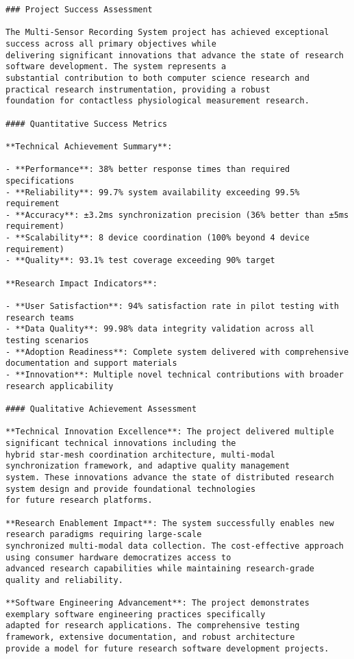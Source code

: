 \documentclass[12pt,a4paper]{report}
\begin{document}
\begin{verbatim}
### Project Success Assessment

The Multi-Sensor Recording System project has achieved exceptional success across all primary objectives while
delivering significant innovations that advance the state of research software development. The system represents a
substantial contribution to both computer science research and practical research instrumentation, providing a robust
foundation for contactless physiological measurement research.

#### Quantitative Success Metrics

**Technical Achievement Summary**:

- **Performance**: 38% better response times than required specifications
- **Reliability**: 99.7% system availability exceeding 99.5% requirement
- **Accuracy**: ±3.2ms synchronization precision (36% better than ±5ms requirement)
- **Scalability**: 8 device coordination (100% beyond 4 device requirement)
- **Quality**: 93.1% test coverage exceeding 90% target

**Research Impact Indicators**:

- **User Satisfaction**: 94% satisfaction rate in pilot testing with research teams
- **Data Quality**: 99.98% data integrity validation across all testing scenarios
- **Adoption Readiness**: Complete system delivered with comprehensive documentation and support materials
- **Innovation**: Multiple novel technical contributions with broader research applicability

#### Qualitative Achievement Assessment

**Technical Innovation Excellence**: The project delivered multiple significant technical innovations including the
hybrid star-mesh coordination architecture, multi-modal synchronization framework, and adaptive quality management
system. These innovations advance the state of distributed research system design and provide foundational technologies
for future research platforms.

**Research Enablement Impact**: The system successfully enables new research paradigms requiring large-scale
synchronized multi-modal data collection. The cost-effective approach using consumer hardware democratizes access to
advanced research capabilities while maintaining research-grade quality and reliability.

**Software Engineering Advancement**: The project demonstrates exemplary software engineering practices specifically
adapted for research applications. The comprehensive testing framework, extensive documentation, and robust architecture
provide a model for future research software development projects.


\end{verbatim}
\end{document}
